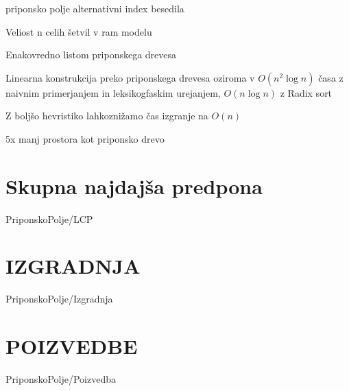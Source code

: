 priponsko polje alternativni index besedila

Veliost n celih šetvil v ram modelu

Enakovredno listom priponskega drevesa

Linearna konstrukcija preko priponskega drevesa oziroma v $O(n^2\log{n})$ časa z naivnim primerjanjem in leksikogfaskim urejanjem,  $O(n\log{n})$ z Radix sort

Z boljšo hevristiko lahkoznižamo čas izgranje na $O(n)$ \cite{Nong2009}



5x manj prostora kot priponsko drevo\cite{Manber1990}

\cite{Manber1990}

\section{Skupna najdajša predpona}\label{sec:LCP}
{PriponskoPolje/LCP}

\section{IZGRADNJA}\label{sec:SAIzgradnja}
{PriponskoPolje/Izgradnja}

\section{POIZVEDBE}\label{sec:SAPoizvedbe}
{PriponskoPolje/Poizvedba}